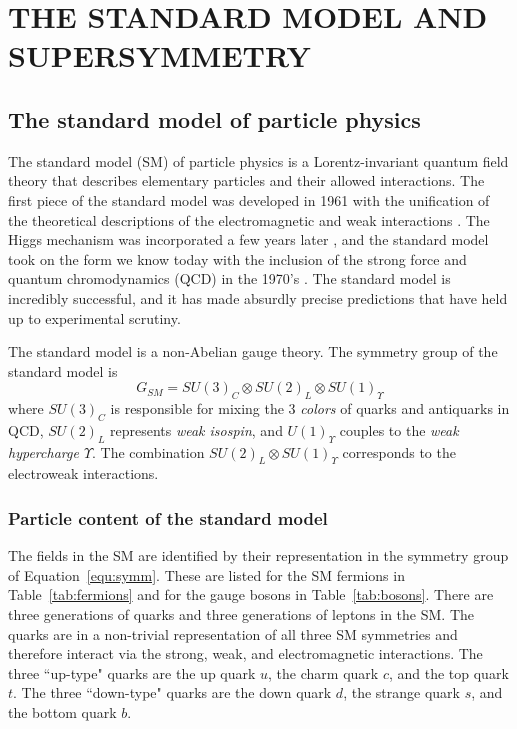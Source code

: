 \chapter{THE STANDARD MODEL AND SUPERSYMMETRY}
\label{chap:theory}

\section{The standard model of particle physics}
\label{sec:StandardModel}
The standard model (SM) of particle physics is a Lorentz-invariant quantum field theory that describes elementary particles and their allowed interactions.
The first piece of the standard model was developed in 1961 with the 
unification of the theoretical descriptions of the electromagnetic and weak interactions 
\cite{GLASHOW1961579,Glashow:1970gm}. 
The Higgs mechanism was incorporated a few years later 
\cite{PhysRev.127.965,PhysRevLett.13.508,PhysRevLett.13.321,Guralnik:1964eu}, and 
the standard model took on the form we know today with the inclusion of the strong force and quantum chromodynamics (QCD) in the 1970's \cite{PhysRevLett.19.1264}.
The standard model is incredibly successful, and it has made absurdly precise predictions that have held up to experimental scrutiny. 

The standard model is a non-Abelian gauge theory. The symmetry group of the standard model is 
\begin{equation}
G_{SM} = SU(3)_C \otimes SU(2)_L \otimes SU(1)_\Upsilon
\label{equ:symm}
\end{equation}
where $SU(3)_C$ is responsible for mixing the 3 \textit{colors} of quarks and antiquarks in QCD, $SU(2)_L$ represents \textit{weak isospin}, and $U(1)_\Upsilon$ couples to the \textit{weak hypercharge $\Upsilon$}. The combination $SU(2)_L \otimes SU(1)_\Upsilon$ corresponds to the electroweak interactions. 

\subsection{Particle content of the standard model}
\label{sec:SMparts}
The fields in the SM are identified by their representation in the symmetry group of Equation~\ref{equ:symm}. These are listed for the SM fermions in Table~\ref{tab:fermions} and for the gauge bosons in Table~\ref{tab:bosons}. There are three generations of quarks and three generations of leptons in the SM. The quarks are in a non-trivial representation of all three SM symmetries and therefore interact via the strong, weak, and electromagnetic interactions. The three ``up-type" quarks are the up quark $u$, the charm quark $c$, and the top quark $t$. The three ``down-type" quarks are the down quark $d$, the strange quark $s$, and the bottom quark $b$. 

